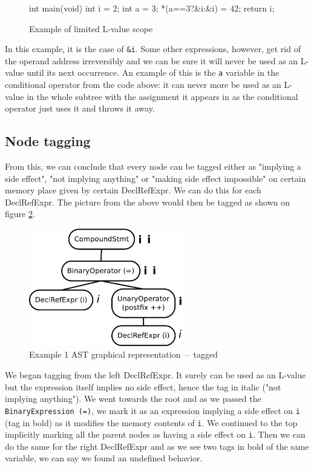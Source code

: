 \begin{figure}[h!]
\caption{Example of limited L-value scope}\label{lvalue-ternary}
\begin{code}
int main(void){
    int i = 2;
    int a = 3;
    *(a==3?&i:&i) = 42;
    return i;
}
\end{code}
\end{figure}

In this example, it is the case of \verb|&i|. Some other expressions, however, get rid of the operand address irreversibly and we can be sure it will never be used as an L-value until its next occurrence. An example of this is the \verb|a| variable in the conditional operator from the code above: it can never more be used as an L-value in the whole subtree with the assignment it appears in as the conditional operator just uses it and throws it away.

\subsection{Node tagging}
From this, we can conclude that every node can be tagged either as "implying a side effect", "not implying anything" or "making side effect impossible" on certain memory place given by certain DeclRefExpr. We can do this for each DeclRefExpr. The picture from the above would then be tagged as shown on figure \ref{ASTtagged}.
\begin{figure}
    \caption{Example 1 AST graphical representation~--~tagged}
    \label{ASTtagged}
    \centering
        \includegraphics[width=0.6\textwidth]{fig/example1G-tagged.pdf}
\end{figure}

We began tagging from the left DeclRefExpr. It surely can be used as an L-value but the expression itself implies no side effect, hence the tag in italic ("not implying anything"). We went towards the root and as we passed the \verb|BinaryExpression (=)|, we mark it as an expression implying a side effect on \verb|i| (tag in bold) as it modifies the memory contents of \verb|i|. We continued to the top implicitly marking all the parent nodes as having a side effect on \verb|i|. Then we can do the same for the right DeclRefExpr and as we see two tags in bold of the same variable, we can say we found an undefined behavior.


